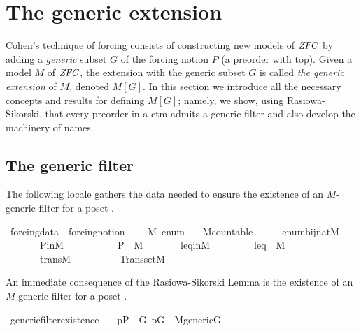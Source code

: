 \section{The generic extension}

Cohen's technique of forcing consists of constructing new models of
$\mathit{ZFC}$ by adding a \emph{generic} subset $G$ of the forcing notion $P$
(a preorder with top). Given a model $M$ of $\mathit{ZFC}$, the extension with
the generic subset $G$ is called \emph{the generic extension} of $M$,
denoted $M[G]$.  In this section we introduce all the necessary
concepts and results for defining $M[G]$; namely, we show, using
Rasiowa-Sikorski, that every preorder in a ctm admits a generic filter
and also develop the machinery of names.

\subsection{The generic filter}
\label{sec:generic-filter}
The following locale gathers the data needed to ensure the 
existence of an $M$-generic filter for a poset . 

\begin{isabelle}
\isamarkupfalse%
\ forcing{\isacharunderscore}data\ {\isacharequal}\ forcing{\isacharunderscore}notion\ {\isacharplus}\isanewline
\ \ \ M\ enum\isanewline
\ \ \ M{\isacharunderscore}countable{\isacharcolon}\ \ \ \ \ \ {\isachardoublequoteopen}enum{\isasymin}bij{\isacharparenleft}nat{\isacharcomma}M{\isacharparenright}{\isachardoublequoteclose}\isanewline
\ \ \ \ \ \ \ P{\isacharunderscore}in{\isacharunderscore}M{\isacharcolon}\ \ \ \ \ \ \ \ \ \ \ {\isachardoublequoteopen}P\ {\isasymin}\ M{\isachardoublequoteclose}\isanewline
\ \ \ \ \ \ \ leq{\isacharunderscore}in{\isacharunderscore}M{\isacharcolon}\ \ \ \ \ \ \ \ \ {\isachardoublequoteopen}leq\ {\isasymin}\ M{\isachardoublequoteclose}\isanewline
\ \ \ \ \ \ \ trans{\isacharunderscore}M{\isacharcolon}\ \ \ \ \ \ \ \ \ \ {\isachardoublequoteopen}Transset{\isacharparenleft}M{\isacharparenright}{\isachardoublequoteclose}
\end{isabelle}

An immediate consequence of the Rasiowa-Sikorski Lemma is the
existence of an $M$-generic filter for a poset .

\begin{isabelle}

\isamarkupfalse%
\ generic{\isacharunderscore}filter{\isacharunderscore}existence{\isacharcolon}\ \isanewline
\ \ {\isachardoublequoteopen}p{\isasymin}P\ {\isasymLongrightarrow}\ {\isasymexists}G{\isachardot}\ p{\isasymin}G\ {\isasymand}\ M{\isacharunderscore}generic{\isacharparenleft}G{\isacharparenright}{\isachardoublequoteclose}
\end{isabelle}

